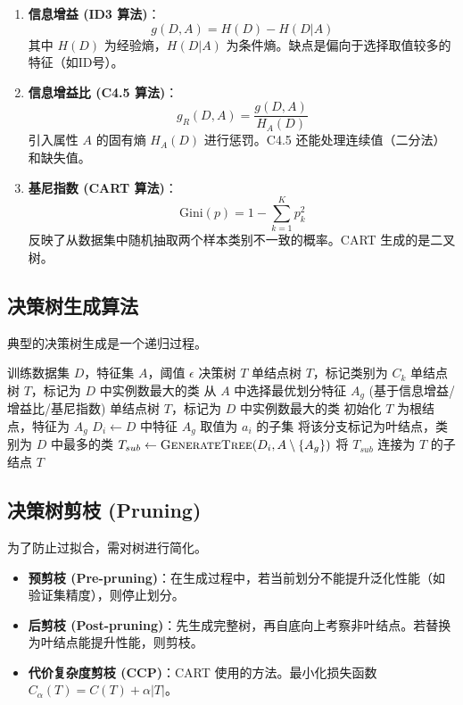 \documentclass[a4paper, 11pt]{ctexart}
\begin{document}
\begin{enumerate}
    \item \textbf{信息增益 (ID3 算法)}：
    $$ g(D, A) = H(D) - H(D|A) $$
    其中 $H(D)$ 为经验熵，$H(D|A)$ 为条件熵。缺点是偏向于选择取值较多的特征（如ID号）。
    
    \item \textbf{信息增益比 (C4.5 算法)}：
    $$ g_R(D, A) = \frac{g(D, A)}{H_A(D)} $$
    引入属性 $A$ 的固有熵 $H_A(D)$ 进行惩罚。C4.5 还能处理连续值（二分法）和缺失值。
    
    \item \textbf{基尼指数 (CART 算法)}：
    $$ \text{Gini}(p) = 1 - \sum_{k=1}^K p_k^2 $$
    反映了从数据集中随机抽取两个样本类别不一致的概率。CART 生成的是二叉树。
\end{enumerate}

\subsection{决策树生成算法}
典型的决策树生成是一个递归过程。

\begin{algorithm}[H]
    \caption{决策树生成算法 (Generic)}
    \begin{algorithmic}[1]
    \Require 训练数据集 $D$，特征集 $A$，阈值 $\epsilon$
    \Ensure 决策树 $T$
            \State \Return 单结点树 $T$，标记类别为 $C_k$
        \EndIf
            \State \Return 单结点树 $T$，标记为 $D$ 中实例数最大的类
        \EndIf
        \State 从 $A$ 中选择最优划分特征 $A_g$ (基于信息增益/增益比/基尼指数)
             \State \Return 单结点树 $T$，标记为 $D$ 中实例数最大的类
        \EndIf
        \State 初始化 $T$ 为根结点，特征为 $A_g$
            \State $D_i \gets D$ 中特征 $A_g$ 取值为 $a_i$ 的子集
                \State 将该分支标记为叶结点，类别为 $D$ 中最多的类
            \Else
                \State $T_{sub} \gets \Call{GenerateTree}{D_i, A \setminus \{A_g\}}$ 
                \State 将 $T_{sub}$ 连接为 $T$ 的子结点
            \EndIf
        \EndFor
        \State \Return $T$
    \EndFunction
    \end{algorithmic}
\end{algorithm}

\subsection{决策树剪枝 (Pruning)}
为了防止过拟合，需对树进行简化。
\begin{itemize}
    \item \textbf{预剪枝 (Pre-pruning)}：在生成过程中，若当前划分不能提升泛化性能（如验证集精度），则停止划分。
    \item \textbf{后剪枝 (Post-pruning)}：先生成完整树，再自底向上考察非叶结点。若替换为叶结点能提升性能，则剪枝。
    \item \textbf{代价复杂度剪枝 (CCP)}：CART 使用的方法。最小化损失函数 $C_\alpha(T) = C(T) + \alpha|T|$。
\end{itemize}
\end{document}
